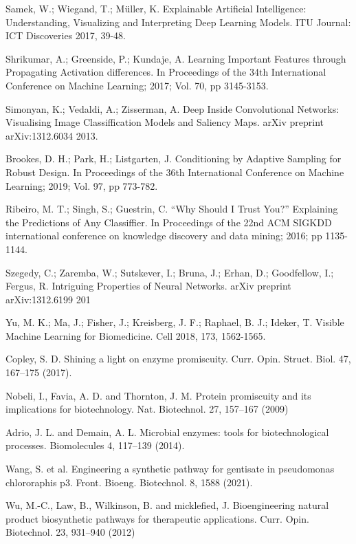 \documentclass[12pt]{article}
\begin{document}
\begin{thebibliography}{99}
 Samek, W.; Wiegand, T.; Müller, K. Explainable Artificial Intelligence: Understanding, Visualizing and Interpreting Deep Learning Models. ITU Journal: ICT Discoveries 2017, 39-48. 

 Shrikumar, A.; Greenside, P.; Kundaje, A. Learning Important Features through Propagating Activation differences. In Proceedings of the 34th International Conference on Machine Learning; 2017; Vol. 70, pp 3145-3153.

 Simonyan, K.; Vedaldi, A.; Zisserman, A. Deep Inside Convolutional Networks: Visualising Image Classiffication Models and Saliency Maps. arXiv preprint arXiv:1312.6034 2013.

 Brookes, D. H.; Park, H.; Listgarten, J. Conditioning by Adaptive Sampling for Robust Design. In Proceedings of the 36th International Conference on Machine Learning; 2019; Vol. 97, pp 773-782.

 Ribeiro, M. T.; Singh, S.; Guestrin, C. “Why Should I Trust You?” Explaining the Predictions of Any Classiffier. In Proceedings of the 22nd ACM SIGKDD international conference on knowledge discovery and data mining; 2016; pp 1135-1144.

 Szegedy, C.; Zaremba, W.; Sutskever, I.; Bruna, J.; Erhan, D.; Goodfellow, I.; Fergus, R. Intriguing Properties of Neural Networks. arXiv preprint arXiv:1312.6199 201

 Yu, M. K.; Ma, J.; Fisher, J.; Kreisberg, J. F.; Raphael, B. J.; Ideker, T. Visible Machine Learning for Biomedicine. Cell 2018, 173, 1562-1565.


 Copley, S. D. Shining a light on enzyme promiscuity. Curr. Opin. Struct. Biol. 47, 167–175 (2017).

 Nobeli, I., Favia, A. D. and Thornton, J. M. Protein promiscuity and its implications for biotechnology. Nat. Biotechnol. 27, 157–167 (2009)

 Adrio, J. L. and Demain, A. L. Microbial enzymes: tools for biotechnological processes. Biomolecules 4, 117–139 (2014).

 Wang, S. et al. Engineering a synthetic pathway for gentisate in pseudomonas chlororaphis p3. Front. Bioeng. Biotechnol. 8, 1588 (2021).

 Wu, M.-C., Law, B., Wilkinson, B. and micklefied, J. Bioengineering natural product biosynthetic pathways for therapeutic applications. Curr. Opin. Biotechnol. 23, 931–940 (2012)



\end{thebibliography}
\end{document}

